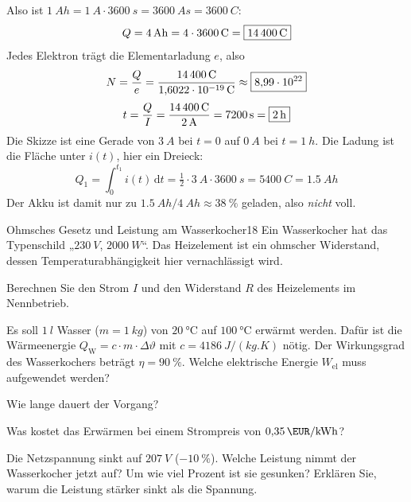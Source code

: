 \documentclass[11pt,a4paper]{article}
\begin{document}
\begin{loesung}
Also ist $\SI{1}{Ah} = \SI{1}{A}\cdot\SI{3600}{s} = \SI{3600}{As} = \SI{3600}{C}$:
\[
  Q = \SI{4}{Ah} = 4 \cdot \SI{3600}{C} = \boxed{\SI{14400}{C}}
\]
Jedes Elektron trägt die Elementarladung $e$, also
\[
  N = \frac{Q}{e} = \frac{\SI{14400}{C}}{\SI{1.6022e-19}{C}} \approx \boxed{\num{8.99e22}}
\]
\[
  t = \frac{Q}{I} = \frac{\SI{14400}{C}}{\SI{2}{A}} = \SI{7200}{s} = \boxed{\SI{2}{h}}
\]
Die Skizze ist eine Gerade von $\SI{3}{A}$ bei $t=0$ auf $\SI{0}{A}$ bei $t = \SI{1}{h}$. Die Ladung ist die Fläche unter $i(t)$, hier ein Dreieck:
\[
  Q_1 = \int_0^{t_1} i(t)\,\mathrm{d}t = \tfrac12 \cdot \SI{3}{A}\cdot\SI{3600}{s} = \SI{5400}{C} = \SI{1.5}{Ah}
\]
Der Akku ist damit nur zu $\SI{1.5}{Ah}/\SI{4}{Ah} \approx \SI{38}{\percent}$ geladen, also \emph{nicht} voll.
\end{loesung}

\begin{aufgabe}{Ohmsches Gesetz und Leistung am Wasserkocher}{18}
Ein Wasserkocher hat das Typenschild „$\SI{230}{V}$, $\SI{2000}{W}$“. Das Heizelement ist ein ohmscher Widerstand, dessen Temperaturabhängigkeit hier vernachlässigt wird.
\begin{teilaufgaben}
  \item Berechnen Sie den Strom $I$ und den Widerstand $R$ des Heizelements im Nennbetrieb.
  \item Es soll $\SI{1}{l}$ Wasser ($m = \SI{1}{kg}$) von $\SI{20}{\celsius}$ auf $\SI{100}{\celsius}$ erwärmt werden. Dafür ist die Wärmeenergie
        $Q_\text{W} = c\cdot m\cdot\Delta\vartheta$ mit $c = \SI{4186}{J/(kg.K)}$ nötig. Der Wirkungsgrad des Wasserkochers beträgt $\eta = \SI{90}{\percent}$.
        Welche elektrische Energie $W_\text{el}$ muss aufgewendet werden?
  \item Wie lange dauert der Vorgang?
  \item Was kostet das Erwärmen bei einem Strompreis von $\SI{0.35}{\EUR/kWh}$?
  \item Die Netzspannung sinkt auf $\SI{207}{V}$ ($\SI{-10}{\percent}$). Welche Leistung nimmt der Wasserkocher jetzt auf? Um wie viel Prozent ist sie gesunken? Erklären Sie, warum die Leistung stärker sinkt als die Spannung.
\end{teilaufgaben}
\end{aufgabe}
\end{document}
